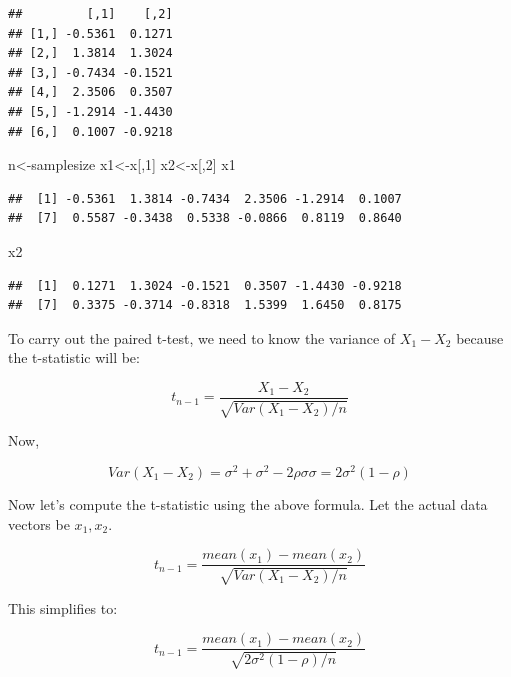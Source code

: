 \documentclass[12pt,]{krantz}
\newenvironment{Shaded}{\begin{snugshade}}{\end{snugshade}}
\newcommand{\DecValTok}[1]{\textcolor[rgb]{0.00,0.00,0.81}{#1}}
\newcommand{\NormalTok}[1]{#1}
\begin{document}
\begin{verbatim}
##         [,1]    [,2]
## [1,] -0.5361  0.1271
## [2,]  1.3814  1.3024
## [3,] -0.7434 -0.1521
## [4,]  2.3506  0.3507
## [5,] -1.2914 -1.4430
## [6,]  0.1007 -0.9218
\end{verbatim}

\begin{Shaded}
\begin{Highlighting}[]
\NormalTok{n<-samplesize}
\NormalTok{x1<-x[,}\DecValTok{1}\NormalTok{]}
\NormalTok{x2<-x[,}\DecValTok{2}\NormalTok{]}
\NormalTok{x1}
\end{Highlighting}
\end{Shaded}

\begin{verbatim}
##  [1] -0.5361  1.3814 -0.7434  2.3506 -1.2914  0.1007
##  [7]  0.5587 -0.3438  0.5338 -0.0866  0.8119  0.8640
\end{verbatim}

\begin{Shaded}
\begin{Highlighting}[]
\NormalTok{x2}
\end{Highlighting}
\end{Shaded}

\begin{verbatim}
##  [1]  0.1271  1.3024 -0.1521  0.3507 -1.4430 -0.9218
##  [7]  0.3375 -0.3714 -0.8318  1.5399  1.6450  0.8175
\end{verbatim}

To carry out the paired t-test,
we need to know the variance of \(X_1-X_2\) because the t-statistic will be:

\begin{equation}
t_{n-1} = \frac{X_1 - X_2}{\sqrt{Var(X_1 - X_2)/n}}
\end{equation}

Now,

\begin{equation}
Var(X_1 - X_2) = \sigma^2 + \sigma^2 - 2 \rho \sigma\sigma = 2\sigma^2 (1-\rho)
\end{equation}

Now let's compute the t-statistic using the above formula. Let the actual data vectors be \(x_1, x_2\).

\begin{equation}
t_{n-1} = \frac{mean(x_1) - mean(x_2)}{\sqrt{Var(X_1 - X_2)/n}}
\end{equation}

This simplifies to:

\begin{equation}
t_{n-1} = \frac{mean(x_1) - mean(x_2)}{\sqrt{2\sigma^2(1-\rho)/n}}
\end{equation}
\end{document}

